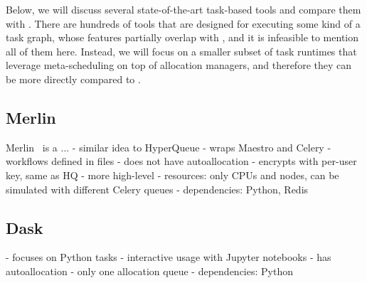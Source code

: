 Below, we will discuss several state-of-the-art task-based tools and compare them with
\hyperqueue{}. There are hundreds of tools that are designed for executing some kind of a
task graph, whose features partially overlap with \hyperqueue{}, and it is infeasible to
mention all of them here. Instead, we will focus on a smaller subset of task runtimes that leverage
meta-scheduling on top of allocation managers, and therefore they can be more directly compared to
\hyperqueue{}.

\subsection*{Merlin}
Merlin~\cite{merlin} is a ...  - similar idea to%
HyperQueue - wraps Maestro and Celery - workflows defined in files - does not have autoallocation -
encrypts with per-user key, same as HQ - more high-level - resources: only CPUs and nodes, can be
simulated with different Celery queues - dependencies: Python, Redis

\subsection*{Dask}
- focuses on Python tasks
- interactive usage with Jupyter notebooks
- has autoallocation
- only one allocation queue
- dependencies: Python



